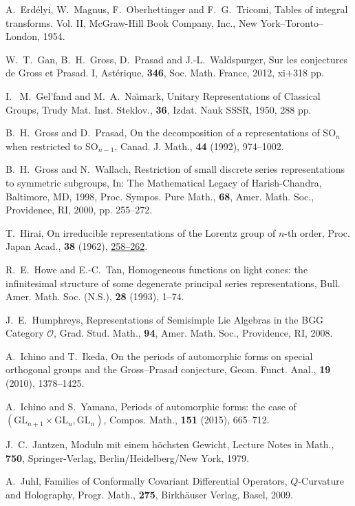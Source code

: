 \begin{thebibliography}{M}
A.~Erd\'elyi, W.~Magnus, F.~Oberhettinger and F.~G.~Tricomi,
Tables of integral transforms. Vol. II,
McGraw-Hill Book Company, Inc., New York--Toronto--London, 1954.

W.~T.~Gan, B.~H.~Gross, D.~Prasad and J.-L.~Waldspurger,
Sur les conjectures de Gross et Prasad. I,
Ast{\'e}rique, {\bf{346}}, Soc. Math. France, 2012, xi+318 pp.

I.~ M.~Gel'fand and M.~A.~Na{\u{\i}}mark,
Unitary Representations of Classical Groups,
Trudy Mat. Inst. Steklov., {\bf{36}}, 
Izdat. Nauk SSSR, 1950, 288 pp.

B.~H.~Gross and D.~Prasad,
On the decomposition of a representations of SO$_n$ when restricted to SO$_{n-1}$,
Canad. J. Math., {\bf{44}} (1992), 974--1002.

B.~H.~Gross and N.~Wallach,
Restriction of small discrete series representations to symmetric subgroups,
In: The Mathematical Legacy of Harish-Chandra, Baltimore, MD, 1998,
Proc. Sympos. Pure Math., {\bf{68}}, Amer. Math. Soc., Providence, RI, 2000,
pp. 255--272.

T.~Hirai,
On irreducible representations of the Lorentz group of $n$-th order,
Proc. Japan Acad., {\textbf{38}} (1962), 
\href{https://projecteuclid.org/euclid.pja/1195523378}
{258--262}. 

R.~E.~Howe and E.-C.~Tan,
Homogeneous functions on light cones: the infinitesimal structure of some
degenerate principal series representations,
Bull. Amer. Math. Soc. (N.S.), {\textbf{28}} (1993), 1--74.

J.~E.~Humphreys,
Representations of Semisimple Lie Algebras in the BGG Category ${\mathcal{O}}$,
Grad. Stud. Math., {\bf{94}}, Amer. Math. Soc., Providence, RI, 2008.

A.~Ichino and T.~Ikeda,
On the periods of automorphic forms on special orthogonal groups and the Gross--Prasad conjecture,
Geom. Funct. Anal., {\bf{19}} (2010), 1378--1425.

A.~Ichino and S.~Yamana,
Periods of automorphic forms: the case of $(\text{GL}_{n+1}\times \text{GL}_{n},\text{GL}_{n})$,
Compos. Math., {\bf{151}} (2015), 665--712.

J.~C.~Jantzen, 
Moduln mit einem h{\"o}chsten Gewicht,
Lecture Notes in Math., 
{\bf 750}, 
Springer-Verlag, 
Berlin/Heidelberg/New York, 
1979.  

A.~Juhl,
Families of Conformally Covariant Differential Operators, $Q$-Curvature and Holography,
Progr. Math., {\bf{275}}, Birkh\"auser Verlag, Basel, 2009.


\end{thebibliography}
